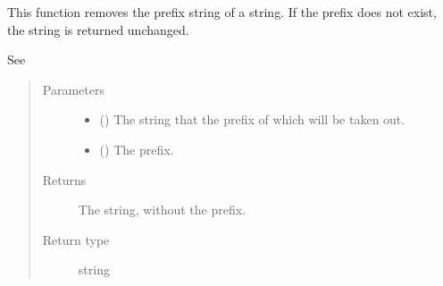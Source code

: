 \documentclass[letterpaper,10pt,english]{sphinxmanual}
\begin{document}
\begin{fulllineitems}
\label{\detokenize{docstrings/ifa_smeargle.core.string_formatting:ifa_smeargle.core.string_formatting.remove_prefix}}
This function removes the prefix string of a string. If
the prefix does not exist, the string is returned unchanged.

See 
\begin{quote}\begin{description}
\item[{Parameters}] \leavevmode\begin{itemize}
\item {} 
 () \textendash{} The string that the prefix of which will be taken out.

\item {} 
 () \textendash{} The prefix.

\end{itemize}

\item[{Returns}] \leavevmode
{} \textendash{} The string, without the prefix.

\item[{Return type}] \leavevmode
string

\end{description}\end{quote}

\end{fulllineitems}

\end{document}
